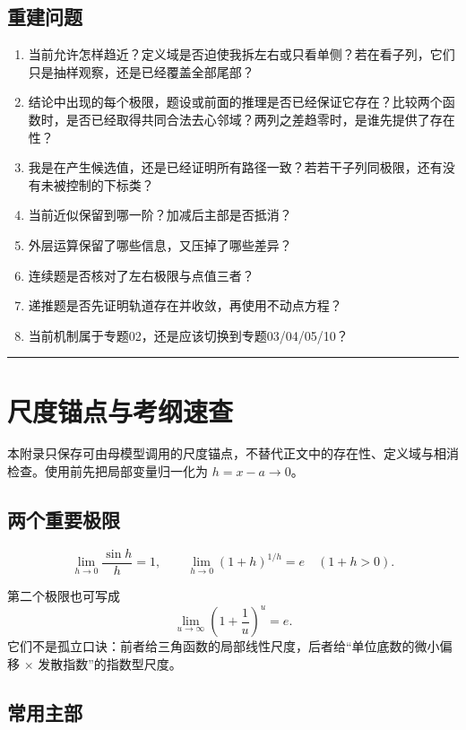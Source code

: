 \documentclass[11pt,a4paper]{ctexart}
\begin{document}
\subsection{重建问题}
\begin{enumerate}
  \item 当前允许怎样趋近？定义域是否迫使我拆左右或只看单侧？若在看子列，它们只是抽样观察，还是已经覆盖全部尾部？
  \item 结论中出现的每个极限，题设或前面的推理是否已经保证它存在？比较两个函数时，是否已经取得共同合法去心邻域？两列之差趋零时，是谁先提供了存在性？
  \item 我是在产生候选值，还是已经证明所有路径一致？若若干子列同极限，还有没有未被控制的下标类？
  \item 当前近似保留到哪一阶？加减后主部是否抵消？
  \item 外层运算保留了哪些信息，又压掉了哪些差异？
  \item 连续题是否核对了左右极限与点值三者？
  \item 递推题是否先证明轨道存在并收敛，再使用不动点方程？
  \item 当前机制属于专题02，还是应该切换到专题03/04/05/10？
\end{enumerate}

\begin{center}\rule{0.5\linewidth}{0.5pt}\end{center}

\appendix
\section{尺度锚点与考纲速查}

本附录只保存可由母模型调用的尺度锚点，不替代正文中的存在性、定义域与相消检查。使用前先把局部变量归一化为 $h=x-a\to0$。

\subsection{两个重要极限}

\[
\lim_{h\to0}\frac{\sin h}{h}=1,
\qquad
\lim_{h\to0}{(1+h)}^{1/h}=e\quad(1+h>0).
\]

第二个极限也可写成
\[
\lim_{u\to\infty}{\left(1+\frac1u\right)}^u=e.
\]
它们不是孤立口诀：前者给三角函数的局部线性尺度，后者给“单位底数的微小偏移 $\times$ 发散指数”的指数型尺度。

\subsection{常用主部}
\end{document}

